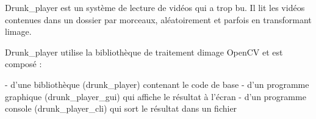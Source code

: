 Drunk\+\_\+player est un système de lecture de vidéos qui a trop bu. Il lit les vidéos contenues dans un dossier par morceaux, aléatoirement et parfois en transformant l\textquotesingle{}image.

Drunk\+\_\+player utilise la bibliothèque de traitement d\textquotesingle{}image Open\+CV et est composé \+: \begin{DoxyVerb}- d'une bibliothèque (drunk_player) contenant le code de base
- d'un programme graphique (drunk_player_gui) qui affiche le résultat à l'écran
- d'un programme console (drunk_player_cli) qui sort le résultat dans un fichier  \end{DoxyVerb}
 